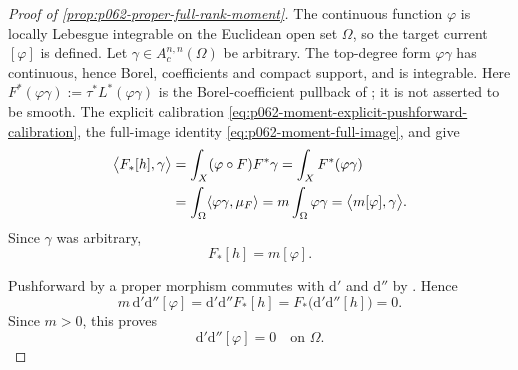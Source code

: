 \begin{proof}[Proof of
\cref{prop:p062-proper-full-rank-moment}]
The continuous function $\varphi$ is locally Lebesgue integrable on the
Euclidean open set $\Omega$, so the target current $[\varphi]$ is defined.
Let $\gamma\in A_c^{n,n}(\Omega)$ be arbitrary.  The top-degree form
$\varphi\gamma$ has continuous, hence Borel, coefficients and compact
support, and is integrable.  Here
$F^*(\varphi\gamma):=\tau^*L^*(\varphi\gamma)$ is the Borel-coefficient
pullback of \cite[Proposition~5.10.1]{CLD25}; it is not asserted to be
smooth.  The explicit calibration
\eqref{eq:p062-moment-explicit-pushforward-calibration}, the full-image
identity \eqref{eq:p062-moment-full-image}, and
\cite[Proposition~5.10.1(c),(d)]{CLD25} give
\begin{align}
 \bigl\langle F_*[h],\gamma\bigr\rangle
  &=\int_X(\varphi\circ F)F^*\gamma
    =\int_XF^*(\varphi\gamma)                         \notag\\
  &=\int_\Omega\langle\varphi\gamma,\mu_F\rangle
    =m\int_\Omega\varphi\gamma
    =\bigl\langle m[\varphi],\gamma\bigr\rangle.
\label{eq:p062-moment-pushforward-current-pairing}
\end{align}
Since $\gamma$ was arbitrary,
\begin{equation}
\label{eq:p062-moment-pushforward-current}
                              F_*[h]=m[\varphi].
\end{equation}

Pushforward by a proper morphism commutes with $\mathrm d'$ and
$\mathrm d''$ by \cite[\S7.7.8]{CLD25}.  Hence
\begin{equation}
\label{eq:p062-moment-target-zero-pushforward}
 m\,\mathrm d'\mathrm d''[\varphi]
 =\mathrm d'\mathrm d''F_*[h]
 =F_*\bigl(\mathrm d'\mathrm d''[h]\bigr)=0.
\end{equation}
Since $m>0$, this proves
\begin{equation}
\label{eq:p062-moment-target-zero-current}
                      \mathrm d'\mathrm d''[\varphi]=0
                      \quad\text{on }\Omega.
\end{equation}


\end{proof}
